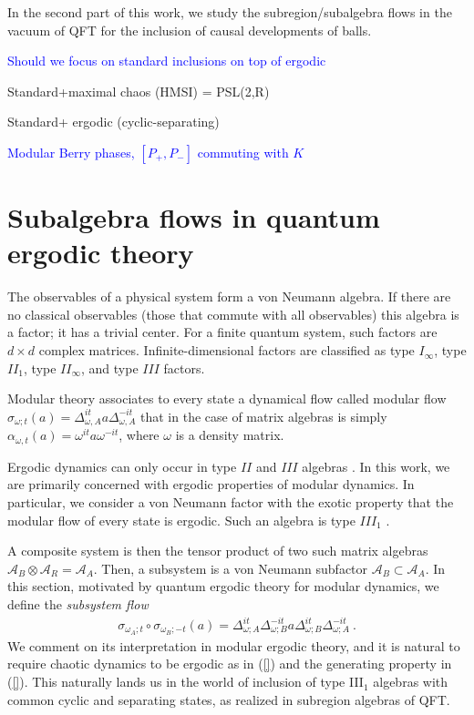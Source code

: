 \documentclass[a4paper,11pt]{article}
\theoremstyle{definition}
\newcommand{\mA}{\mathcal{A}}
\newcommand{\NL}[1]{\textcolor{blue}{#1}}
\begin{document}
In the second part of this work, we study the subregion/subalgebra flows in the vacuum of QFT for the inclusion of causal developments of balls.




\NL{Should we focus on standard inclusions on top of ergodic}

Standard+maximal chaos (HMSI)  = PSL(2,R)

Standard+ ergodic (cyclic-separating)

\NL{Modular Berry phases, $[P_+,P_-]$ commuting with $K$}



\section{Subalgebra flows in quantum ergodic theory}\label{section:basics}
\label{subsec:quantum-coarse}

The observables of a physical system form a von Neumann algebra. If there are no classical observables (those that commute with all observables) this algebra is a factor; it has a trivial center. For a finite quantum system, such factors are $d\times d$ complex matrices. Infinite-dimensional factors are classified as type $I_\infty$, type $II_1$, type $II_\infty$, and type $III$ factors. 

Modular theory associates to every state a dynamical flow called modular flow $\sigma_{\omega;t}(a)=\Delta_{\omega,A}^{it}a\Delta_{\omega,A}^{-it}$ that in the case of matrix algebras is simply $\alpha_{\omega,t}(a)=\omega^{it} a\omega^{-it}$, where $\omega$ is a density matrix. 

Ergodic dynamics can only occur in type $II$ and $III$ algebras \cite{}. In this work, we are primarily concerned with ergodic properties of modular dynamics. In particular, we consider a von Neumann factor with the exotic property that the modular flow of every state is ergodic. Such an algebra is type $III_1$ \cite{}.

A composite system is then the tensor product of two such matrix algebras $\mA_B\otimes \mA_R=\mA_A$. Then, a subsystem is a von Neumann subfactor $\mA_B\subset \mA_A$. In this section, motivated by quantum ergodic theory for modular dynamics, we define the {\it subsystem flow}
\begin{align}
    \sigma_{\omega_A;t}\circ \sigma_{\omega_B;-t}(a)=\Delta_{\omega;A}^{it}\Delta_{\omega;B}^{-it}a\Delta_{\omega;B}^{it}\Delta_{\omega;A}^{-it}\ .
\end{align}
We comment on its interpretation in modular ergodic theory, and it is natural to require chaotic dynamics to be ergodic as in (\ref{}) and the generating property in (\ref{}). This naturally lands us in the world of inclusion of type III$_1$ algebras with common cyclic and separating states, as realized in subregion algebras of QFT. 
\end{document}
